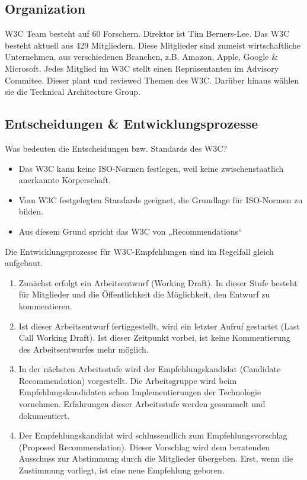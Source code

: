 \documentclass[11pt]{article}
\begin{document}
\subsection{Organization}
\label{sec:org563f00b}
W3C Team besteht auf 60 Forschern. Direktor ist Tim Berners-Lee.
Das W3C besteht aktuell aus 429 Mitgliedern. Diese Mitglieder sind zumeist wirtschaftliche Unternehmen, aus verschiedenen Branchen, z.B. Amazon, Apple, Google \& Microsoft.
Jedes Mitglied im W3C stellt einen Repräsentanten im Advisory Commitee. Dieser plant und reviewed Themen des W3C. Darüber hinaus wählen sie die Technical Architecture Group.

\subsection{Entscheidungen \& Entwicklungsprozesse}
\label{sec:org986a70a}
Was bedeuten die Entscheidungen bzw. Standards des W3C?
\begin{itemize}
\item Das W3C kann keine ISO-Normen festlegen, weil keine zwischenstaatlich anerkannte Körperschaft.
\item Vom W3C festgelegten Standards geeignet, die Grundlage für ISO-Normen zu bilden.
\item Aus diesem Grund spricht das W3C von „Recommendations“
\end{itemize}

Die Entwicklungsprozesse für W3C-Empfehlungen sind im Regelfall gleich aufgebaut.
\begin{enumerate}
\item Zunächst erfolgt ein Arbeitsentwurf (Working Draft). In dieser Stufe besteht für Mitglieder und die Öffentlichkeit die Möglichkeit, den Entwurf zu kommentieren.
\item Ist dieser Arbeitsentwurf fertiggestellt, wird ein letzter Aufruf gestartet (Last Call Working Draft). Ist dieser Zeitpunkt vorbei, ist keine Kommentierung des Arbeitsentwurfes mehr möglich.
\item In der nächsten Arbeitsstufe wird der Empfehlungskandidat (Candidate Recommendation) vorgestellt. Die Arbeitsgruppe wird beim Empfehlungskandidaten schon Implementierungen der Technologie vornehmen. Erfahrungen dieser Arbeitsstufe werden gesammelt und dokumentiert.
\item Der Empfehlungskandidat wird schlussendlich zum Empfehlungsvorschlag (Proposed Recommendation). Dieser Vorschlag wird dem beratenden Ausschuss zur Abstimmung durch die Mitglieder übergeben. Erst, wenn die Zustimmung vorliegt, ist eine neue Empfehlung geboren.
\end{enumerate}
\end{document}
